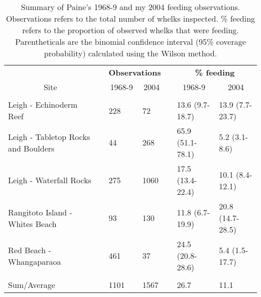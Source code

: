 \begin{table}[!htbp]
\caption{Summary of Paine's 1968-9 and my 2004 feeding observations.  
Observations refers to the total number of whelks inspected. \% feeding refers 
to the proportion of observed whelks that were feeding. Parentheticals are the 
binomial confidence interval (95\% coverage probability) calculated using the 
Wilson method.\label{tab:summ}} 
{\centering
\begin{tabular}{lcllcll}
\hline
\multicolumn{1}{c}{\bfseries }&\multicolumn{1}{c}{\bfseries }&\multicolumn{2}{c}{\bfseries Observations}&\multicolumn{1}{c}{\bfseries }&\multicolumn{2}{c}{\bfseries \% feeding}\tabularnewline
\cline{3-4} \cline{6-7}
\multicolumn{1}{c}{Site}&\multicolumn{1}{c}{}&\multicolumn{1}{c}{1968-9}&\multicolumn{1}{c}{2004}&\multicolumn{1}{c}{}&\multicolumn{1}{c}{1968-9}&\multicolumn{1}{c}{2004}\tabularnewline
\hline
&&&&&&\tabularnewline
Leigh - Echinoderm Reef&&228&72&&13.6 (9.7-18.7)&13.9 (7.7-23.7)\tabularnewline
Leigh - Tabletop Rocks and Boulders&&44&268&&65.9 (51.1-78.1)&5.2 (3.1-8.6)\tabularnewline
Leigh - Waterfall Rocks&&275&1060&&17.5 (13.4-22.4)&10.1 (8.4-12.1)\tabularnewline
Rangitoto Island - Whites Beach&&93&130&&11.8 (6.7-19.9)&20.8 (14.7-28.5)\tabularnewline
Red Beach - Whangaparaoa&&461&37&&24.5 (20.8-28.6)&5.4 (1.5-17.7)\tabularnewline
\hline
&&&&&&\tabularnewline
Sum/Average&&1101&1567&&26.7&11.1\tabularnewline
\hline
\end{tabular}}
\end{table}

